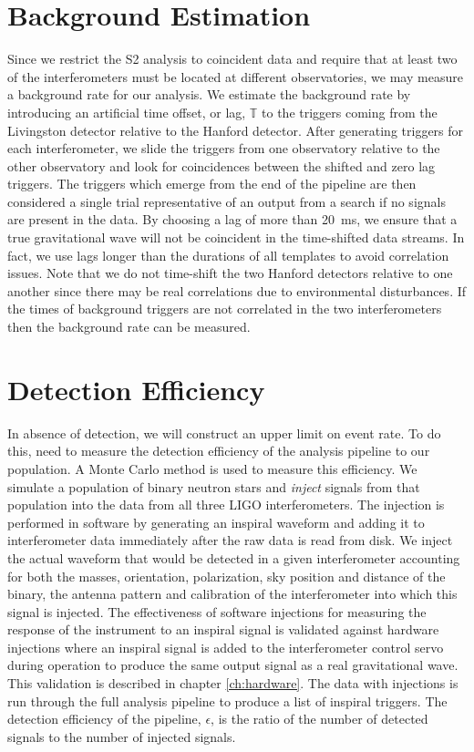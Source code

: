 \section{Background Estimation}
\label{s:background}

Since we restrict the S2 analysis to coincident data and require that at least
two of the interferometers must be located at different observatories, we may
measure a background rate for our analysis.  We estimate the background rate
by introducing an artificial time offset, or {lag}, $\mathbb{T}$ to the
triggers coming from the Livingston detector relative to the Hanford detector.
After generating triggers for each interferometer, we slide the triggers from
one observatory relative to the other observatory and look for coincidences
between the shifted and zero lag triggers.  The triggers which emerge from the
end of the pipeline are then considered a single trial representative of an
output from a search if no signals are present in the data.   By choosing a
lag of more than 20~ms, we ensure that a true gravitational wave will not be
coincident in the time-shifted data streams.  In fact, we use lags longer than
the durations of all templates to avoid correlation issues.  Note that we do
not time-shift the two Hanford detectors relative to one another since there
may be real correlations due to environmental disturbances.  If the times of
background triggers are not correlated in the two interferometers then the
background rate can be measured.

\section{Detection Efficiency}
\label{s:eff}

In absence of detection, we will construct an upper limit on event rate.  To
do this, need to measure the detection efficiency of the analysis pipeline to
our population. A Monte Carlo method is used to measure this efficiency. We
simulate a population of binary neutron stars and \emph{inject} signals from
that population into the data from all three LIGO interferometers. The
injection is performed in software by generating an inspiral waveform and
adding it to interferometer data immediately after the raw data is read from
disk. We inject the actual waveform that would be detected in a given
interferometer accounting for both the masses, orientation, polarization, sky
position and distance of the binary, the antenna pattern and calibration of
the interferometer into which this signal is injected.  The effectiveness of
software injections for measuring the response of the instrument to an
inspiral signal is validated against hardware injections where
an inspiral signal is added to the interferometer control servo during
operation to produce the same output signal as a real gravitational wave. This
validation is described in chapter \ref{ch:hardware}. The
data with injections is run through the full analysis pipeline to produce a
list of inspiral triggers. The detection efficiency of the pipeline,
$\epsilon$, is the ratio of the number of detected signals to the number of
injected signals.

